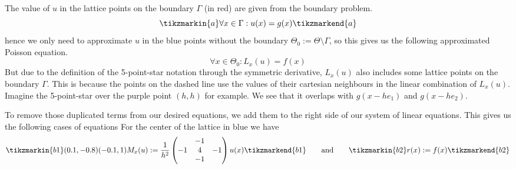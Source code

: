 The value of \(u\) in the lattice points on the boundary \(\Gamma\) (in red) are given from the boundary problem.
\begin{equation*}
   \tikzmarkin{a} \forall x \in \Gamma: u(x) = g(x) \tikzmarkend{a}
\end{equation*}
hence we only need to approximate \(u\) in the blue points without the boundary \(\Theta_0 := \Theta \setminus \Gamma\), so this gives us the following approximated Poisson equation.
\[\forall x \in \Theta_0: L_x(u) = f(x)\]
But due to the definition of the 5-point-star notation through the symmetric derivative, \(L_x(u)\) also includes some lattice points on the boundary \(\Gamma\).
This is because the points on the dashed line use the values of their cartesian neighbours in the linear combination of \(L_x(u)\).
Imagine the 5-point-star over the purple point \((h, h)\) for example.
We see that it overlaps with \(g(x-he_1)\) and \(g(x-he_2)\).

\begin{center}
   
\end{center}

To remove those duplicated terms from our desired equations, we add them to the right side of our system of linear equations.
This gives us the following cases of equations
For the center of the lattice in blue we have
\begin{equation*}
   \tikzmarkin{b1} (0.1,-0.8)(-0.1,1) M_x(u) := \frac{1}{h^2} \begin{pmatrix} & -1 & \\ -1 & 4 & -1\\ & -1 & \end{pmatrix} u(x) \tikzmarkend{b1} \qquad\text{and}\qquad \tikzmarkin{b2} r(x) := f(x) \tikzmarkend{b2}
\end{equation*}

